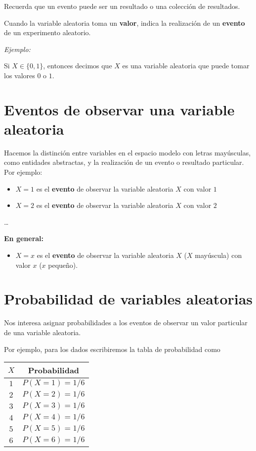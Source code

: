 \documentclass[
]{book}
\providecommand{\tightlist}{%
  \setlength{\itemsep}{0pt}\setlength{\parskip}{0pt}}
\begin{document}
Recuerda que un evento puede ser un resultado o una colección de resultados.

Cuando la variable aleatoria toma un \textbf{valor}, indica la realización de un \textbf{evento} de un experimento aleatorio.

\emph{Ejemplo:}

Si \(X \in \{0,1\}\), entonces decimos que \(X\) es una variable aleatoria que puede tomar los valores \(0\) o \(1\).

\hypertarget{eventos-de-observar-una-variable-aleatoria}{%
\section{Eventos de observar una variable aleatoria}\label{eventos-de-observar-una-variable-aleatoria}}

Hacemos la distinción entre variables en el espacio modelo con letras mayúsculas, como entidades abstractas, y la realización de un evento o resultado particular. Por ejemplo:

\begin{itemize}
\tightlist
\item
  \(X=1\) es el \textbf{evento} de observar la variable aleatoria \(X\) con valor \(1\)
\item
  \(X=2\) es el \textbf{evento} de observar la variable aleatoria \(X\) con valor \(2\)
\end{itemize}

\ldots{}

\textbf{En general:}

\begin{itemize}
\tightlist
\item
  \(X=x\) es el \textbf{evento} de observar la variable aleatoria \(X\) (\(X\) mayúscula) con valor \(x\) (\(x\) pequeño).
\end{itemize}

\hypertarget{probabilidad-de-variables-aleatorias}{%
\section{Probabilidad de variables aleatorias}\label{probabilidad-de-variables-aleatorias}}

Nos interesa asignar probabilidades a los eventos de observar un valor particular de una variable aleatoria.

Por ejemplo, para los dados escribiremos la tabla de probabilidad como

\begin{longtable}[]{@{}cc@{}}
\toprule
\(X\) & Probabilidad \\
\midrule
\endhead
\(1\) & \(P(X=1)=1/6\) \\
\(2\) & \(P(X=2)=1/6\) \\
\(3\) & \(P(X=3)=1/6\) \\
\(4\) & \(P(X=4)=1/6\) \\
\(5\) & \(P(X=5)=1/6\) \\
\(6\) & \(P(X=6)=1/6\) \\
\bottomrule
\end{longtable}
\end{document}
